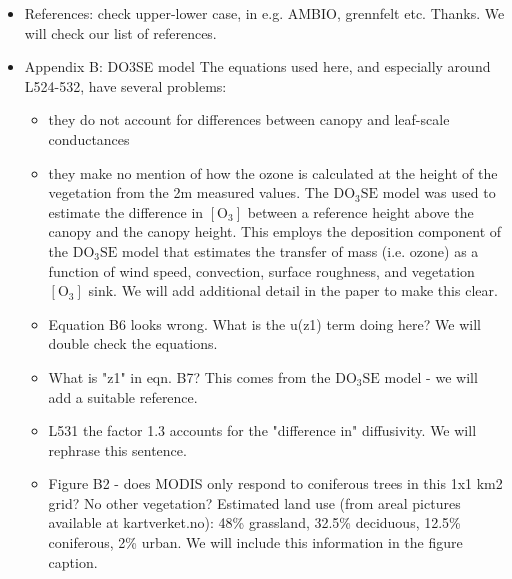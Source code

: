 \documentclass{scrartcl}
\begin{document}
\begin{itemize}
\item {\color{blue}References: check upper-lower case, in e.g. AMBIO, grennfelt etc.}
Thanks. We will check our list of references.
 
\item {\color{blue}Appendix B: DO3SE model
The equations used here, and especially around L524-532, have several problems:
\begin{itemize}
\item they do not account for differences between canopy and leaf-scale conductances
\item they make no mention of how the ozone is calculated at the height of the vegetation from the 2m measured values.
{\color{black}The $\mathrm{DO_3SE}$ model was used to estimate the difference in $[\mathrm{O_3}]$ between a reference height above the canopy and the canopy height. This employs the deposition component of the $\mathrm{DO_3SE}$ model that estimates the transfer of mass (i.e. ozone) as a function of wind speed, convection, surface roughness, and vegetation $[\mathrm{O_3}]$ sink. We will add additional detail in the paper to make this clear.}
\item Equation B6 looks wrong. What is the u(z1) term doing here?
{\color{black}We will double check the equations.}
\item What is "z1" in eqn. B7?
{\color{black}This comes from the $\mathrm{DO_3SE}$ model - we will add a suitable reference.}
\item L531 the factor 1.3 accounts for the "difference in" diffusivity.
{\color{black}We will rephrase this sentence.}
\item Figure B2 - does MODIS only respond to coniferous trees in this 1x1 km2 grid? No other vegetation?
{\color{black}Estimated land use (from areal pictures available at kartverket.no): 48\% grassland, 32.5\% deciduous, 12.5\% coniferous, 2\% urban. We will include this information in the figure caption.}
\end{itemize}}
 
\end{itemize}
\end{document}
